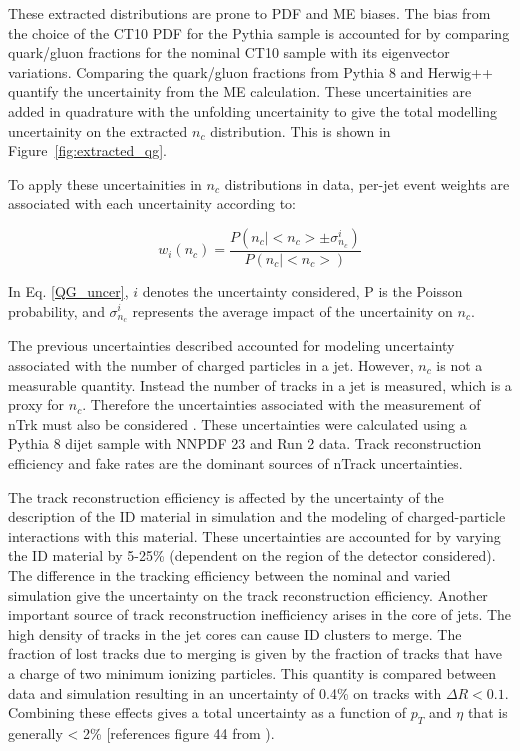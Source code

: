 These extracted distributions are prone to PDF and ME biases. The bias from the choice of the CT10 PDF for the Pythia sample is accounted for by comparing quark/gluon fractions for the nominal CT10 sample with its eigenvector variations. Comparing the quark/gluon fractions from Pythia 8 and Herwig++ quantify the uncertainity from the ME calculation. These uncertainities are added in quadrature with the unfolding uncertainity to give the total modelling uncertainity on the extracted $n_{c}$ distribution. This is shown in Figure~\ref{fig:extracted_qg}.

To apply these uncertainities in $n_{c}$ distributions in data, per-jet event weights are associated with each uncertainity according to:

\begin{equation}
w_{i}(n_{c}) = \frac{P(n_{c}|<n_{c}> \pm \sigma^{i}_{n_{c}})} {P(n_{c}|<n_{c}>)}
\label{QG_uncer}
\end{equation}

In Eq. \ref{QG_uncer}, $i$ denotes the uncertainty considered, P is the Poisson probability, and $\sigma^{i}_{n_{c}}$ represents the average impact of the uncertainity on $n_{c}$. 



The previous uncertainties described accounted for modeling uncertainty associated with the number of charged particles in a jet. However, $n_{c}$ is not a measurable quantity. Instead the number of tracks in a jet is measured, which is a proxy for $n_{c}$. Therefore the uncertainties associated with the measurement of nTrk must also be considered \cite{JetFrag}. These uncertainties were calculated using a Pythia 8 dijet sample with NNPDF 23 and Run 2 data. Track reconstruction efficiency and fake rates are the dominant sources of nTrack uncertainties. 

The track reconstruction efficiency is affected by the uncertainty of the description of the ID material in simulation and the modeling of charged-particle interactions with this material. These uncertainties are accounted for by varying the ID material by 5-25\% (dependent on the region of the detector considered). The difference in the tracking efficiency between the nominal and varied simulation give the uncertainty on the track reconstruction efficiency. Another important source of track reconstruction inefficiency arises in the core of jets. The high density of tracks in the jet cores can cause ID clusters to merge. The fraction of lost tracks due to merging is given by the fraction of tracks that have a charge of two minimum ionizing particles. This quantity is compared between data and simulation resulting in an uncertainty of 0.4\% on tracks with $\Delta R < 0.1$. Combining these effects gives a total uncertainty as a function of $p_{T}$ and $\eta$ that is generally < 2\% [references figure 44 from \cite{JetFrag}). 

